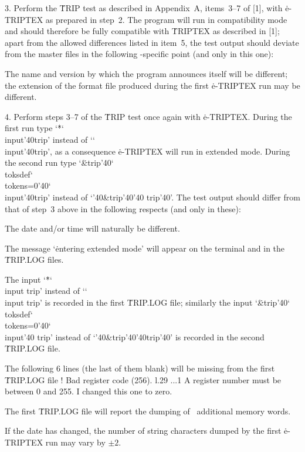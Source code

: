 \item{3.} Perform the \.{TRIP} test as described in Appendix~A,
items~3--7 of [1], with \.{e-TRIPTEX} as prepared in step~2.  The program
will run in compatibility mode and should therefore be fully compatible
with \.{TRIPTEX} as described in [1]; apart from the allowed differences
listed in item~5, the test output should deviate from the master files in
the following \eTeX-specific point (and only in this one):

 The name and version by which the program announces itself
will be different; the extension of the format file produced during the
first \.{e-TRIPTEX} run may be different.

\def\bs{{\char`\\}}
\def\sp{{\char'40}}

\item{4.} Perform steps 3--7 of the \.{TRIP} test once again with
\.{e-TRIPTEX}.  During the first run type `\.{*\bs input\sp trip}'
instead of `\.{\bs input\sp trip}', as a consequence \.{e-TRIPTEX} will
run in extended mode.  During the second run type `\.{\&trip\sp\bs
toksdef\bs tokens=0\sp\bs input\sp trip}' instead of `\.{\sp\&trip\sp\sp
trip\sp}'.  The test output should differ from that of step~3 above in
the following respects (and only in these):

 The date and\slash or time will naturally be different.

 The message `\.{entering extended mode}' will appear on
the terminal and in the \.{TRIP.LOG} files.

 The input `\.{*\bs input trip}' instead of
`\.{\bs input trip}' is recorded in the first \.{TRIP.LOG} file;
similarly the input `\.{\&trip\sp\bs toksdef\bs tokens=0\sp\bs input\sp
trip}' instead of `\.{\sp\&trip\sp\sp trip\sp}' is recorded in the
second \.{TRIP.LOG} file.

 The following 6 lines (the last of them blank) will be
missing from the first \.{TRIP.LOG} file
! Bad register code (256).
l.29 ...{1} \toksdef{}
                                \show\errorstopmode
A register number must be between 0 and 255.
I changed this one to zero.


 The first \.{TRIP.LOG} file will report the dumping of
\extramw~additional memory words.

 If the date has changed, the number of string characters
dumped by the first \.{e-TRIPTEX} run may vary by $\pm2$.

